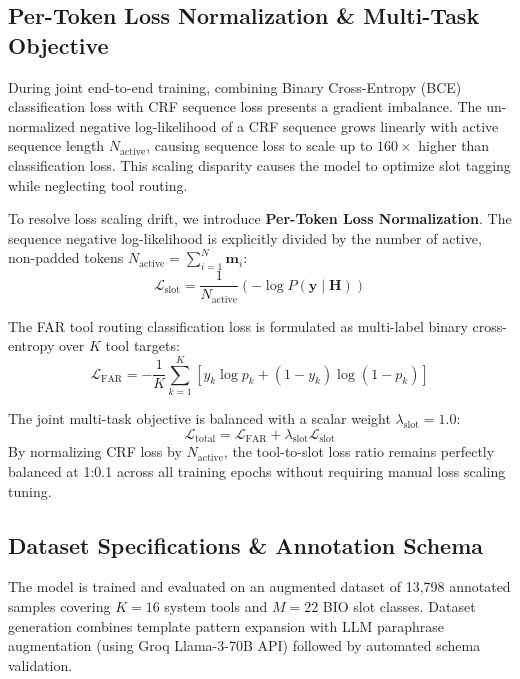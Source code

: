 \documentclass[conference]{IEEEtran}
\begin{document}
\subsection{Per-Token Loss Normalization \& Multi-Task Objective}
During joint end-to-end training, combining Binary Cross-Entropy (BCE) classification loss with CRF sequence loss presents a gradient imbalance. The un-normalized negative log-likelihood of a CRF sequence grows linearly with active sequence length $N_{\text{active}}$, causing sequence loss to scale up to $160\times$ higher than classification loss. This scaling disparity causes the model to optimize slot tagging while neglecting tool routing.

To resolve loss scaling drift, we introduce \textbf{Per-Token Loss Normalization}. The sequence negative log-likelihood is explicitly divided by the number of active, non-padded tokens $N_{\text{active}} = \sum_{i=1}^N \mathbf{m}_i$:
\begin{equation}
    \mathcal{L}_{\text{slot}} = \frac{1}{N_{\text{active}}} \left( -\log P(\mathbf{y} \mid \mathbf{H}) \right)
\end{equation}

The FAR tool routing classification loss is formulated as multi-label binary cross-entropy over $K$ tool targets:
\begin{equation}
    \mathcal{L}_{\text{FAR}} = -\frac{1}{K} \sum_{k=1}^K \left[ y_k \log p_k + (1 - y_k) \log (1 - p_k) \right]
\end{equation}

The joint multi-task objective is balanced with a scalar weight $\lambda_{\text{slot}} = 1.0$:
\begin{equation}
    \mathcal{L}_{\text{total}} = \mathcal{L}_{\text{FAR}} + \lambda_{\text{slot}} \mathcal{L}_{\text{slot}}
\end{equation}
By normalizing CRF loss by $N_{\text{active}}$, the tool-to-slot loss ratio remains perfectly balanced at 1:0.1 across all training epochs without requiring manual loss scaling tuning.

\subsection{Dataset Specifications \& Annotation Schema}

The model is trained and evaluated on an augmented dataset of 13,798 annotated samples covering $K=16$ system tools and $M=22$ BIO slot classes. Dataset generation combines template pattern expansion with LLM paraphrase augmentation (using Groq Llama-3-70B API) followed by automated schema validation.
\end{document}
